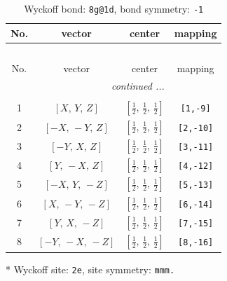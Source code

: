 \documentclass[fleqn,8pt]{jsarticle}
\begin{document}
\begin{longtable}{cccc}
\caption{Wyckoff bond: {\tt 8g@1d}, bond symmetry: {\tt -1}}
 \\
 \hline \hline
No. & vector & center & mapping \\ \hline \endfirsthead

\multicolumn{3}{l}{\tablename\ \thetable{}} \\
 \hline \hline
No. & vector & center & mapping \\ \hline \endhead

 \hline \hline
\multicolumn{3}{r}{\footnotesize\it continued ...} \\ \endfoot

 \hline \hline
\multicolumn{3}{r}{} \\ \endlastfoot

1 & $\left[ X,\, Y,\, Z \right]$ & $\left[ \frac{1}{2},\, \frac{1}{2},\, \frac{1}{2} \right]$ & {\tt [1,-9]} \\ \hline
2 & $\left[ - X,\, - Y,\, Z \right]$ & $\left[ \frac{1}{2},\, \frac{1}{2},\, \frac{1}{2} \right]$ & {\tt [2,-10]} \\ \hline
3 & $\left[ - Y,\, X,\, Z \right]$ & $\left[ \frac{1}{2},\, \frac{1}{2},\, \frac{1}{2} \right]$ & {\tt [3,-11]} \\ \hline
4 & $\left[ Y,\, - X,\, Z \right]$ & $\left[ \frac{1}{2},\, \frac{1}{2},\, \frac{1}{2} \right]$ & {\tt [4,-12]} \\ \hline
5 & $\left[ - X,\, Y,\, - Z \right]$ & $\left[ \frac{1}{2},\, \frac{1}{2},\, \frac{1}{2} \right]$ & {\tt [5,-13]} \\ \hline
6 & $\left[ X,\, - Y,\, - Z \right]$ & $\left[ \frac{1}{2},\, \frac{1}{2},\, \frac{1}{2} \right]$ & {\tt [6,-14]} \\ \hline
7 & $\left[ Y,\, X,\, - Z \right]$ & $\left[ \frac{1}{2},\, \frac{1}{2},\, \frac{1}{2} \right]$ & {\tt [7,-15]} \\ \hline
8 & $\left[ - Y,\, - X,\, - Z \right]$ & $\left[ \frac{1}{2},\, \frac{1}{2},\, \frac{1}{2} \right]$ & {\tt [8,-16]} \\
\end{longtable}
* Wyckoff site: {\tt 2e}, site symmetry: {\tt mmm.}
\renewcommand{\arraystretch}{1.2}
\end{document}
